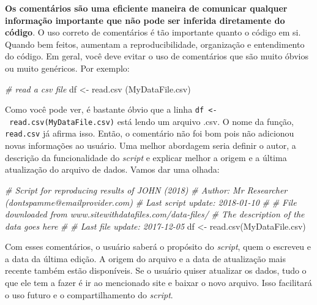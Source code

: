\documentclass[
  11pt,
]{book}
\newenvironment{Shaded}{\begin{snugshade}}{\end{snugshade}}
\newcommand{\CommentTok}[1]{\textcolor[rgb]{0.37,0.37,0.37}{\textit{#1}}}
\newcommand{\FunctionTok}[1]{\textcolor[rgb]{0,0,0}{#1}}
\newcommand{\NormalTok}[1]{#1}
\newcommand{\OtherTok}[1]{\textcolor[rgb]{0.37,0.37,0.37}{#1}}
\newcommand{\StringTok}[1]{\textcolor[rgb]{0.5,0.5,0.5}{#1}}
\begin{document}
\textbf{Os comentários são uma eficiente maneira de comunicar qualquer informação importante que não pode ser inferida diretamente do código}. O uso correto de comentários é tão importante quanto o código em si. Quando bem feitos, aumentam a reproducibilidade, organização e entendimento do código. Em geral, você deve evitar o uso de comentários que são muito óbvios ou muito genéricos. Por exemplo:

\begin{Shaded}
\begin{Highlighting}[]
\CommentTok{\# read a csv file}
\NormalTok{df }\OtherTok{\textless{}{-}} \FunctionTok{read.csv}\NormalTok{ (}\StringTok{\textquotesingle{}MyDataFile.csv\textquotesingle{}}\NormalTok{)}
\end{Highlighting}
\end{Shaded}

Como você pode ver, é bastante óbvio que a linha \texttt{df\ \textless{}-\ read.csv(\textquotesingle{}MyDataFile.csv\textquotesingle{})} está lendo um arquivo .csv. O nome da função, \texttt{read.csv} já afirma isso. Então, o comentário não foi bom pois não adicionou novas informações ao usuário. Uma melhor abordagem seria definir o autor, a descrição da funcionalidade do \emph{script} e explicar melhor a origem e a última atualização do arquivo de dados. Vamos dar uma olhada:

\begin{Shaded}
\begin{Highlighting}[]
\CommentTok{\# Script for reproducing results of JOHN (2018)}
\CommentTok{\# Author: Mr Researcher (dontspamme@emailprovider.com)}
\CommentTok{\# Last script update: 2018{-}01{-}10}
\CommentTok{\#}
\CommentTok{\# File downloaded from www.sitewithdatafiles.com/data{-}files/}
\CommentTok{\# The description of the data goes here}
\CommentTok{\#}
\CommentTok{\# Last file update: 2017{-}12{-}05}
\NormalTok{df }\OtherTok{\textless{}{-}} \FunctionTok{read.csv}\NormalTok{(}\StringTok{\textquotesingle{}MyDataFile.csv\textquotesingle{}}\NormalTok{)}
\end{Highlighting}
\end{Shaded}

Com esses comentários, o usuário saberá o propósito do \emph{script}, quem o escreveu e a data da última edição. A origem do arquivo e a data de atualização mais recente também estão disponíveis. Se o usuário quiser atualizar os dados, tudo o que ele tem a fazer é ir ao mencionado site e baixar o novo arquivo. Isso facilitará o uso futuro e o compartilhamento do \emph{script}.
\end{document}
